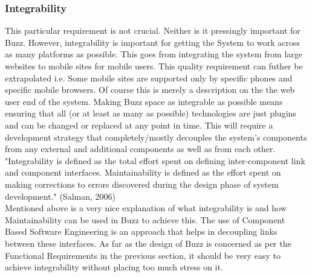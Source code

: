 \subsubsection{Integrability}
This particular requirement is not crucial. Neither is it pressingly important for Buzz. However, integrability is important for getting the System to work across as many platforms as possible. This goes from integrating the system from large websites to mobile sites for mobile users. This quality requirement can futher be extrapolated i.e. Some mobile sites are supported only by specific phones and specific mobile browsers. Of course this is merely a description on the the web user end of the system. Making Buzz space as integrable as possible means ensuring that all (or at least as many as possible) technologies are just plugins and can be changed or replaced at any point in time. This will require a development strategy that completely/mostly decouples the system's components from any external and additional components as well as from each other.\\
"Integrability is defined as the total effort spent on defining inter-component link and component interfaces.  Maintainability is defined as the effort spent on making corrections to errors discovered during the design phase of system development." (Salman, 2006)\\
Mentioned above is a very nice explanation of what integrability is and how Maintainability can be used in Buzz to achieve this. The use of Component Based Software Engineering is an approach that helps in decoupling links between these interfaces. As far as the design of Buzz is concerned as per the Functional Requirements in the previous section, it should be very easy to achieve integrability without placing too much stress on it.\\
\\


